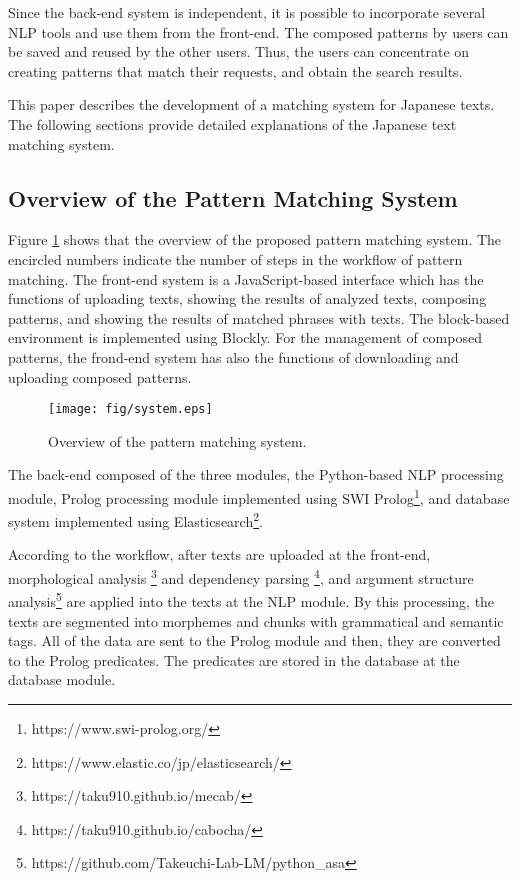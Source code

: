 \documentclass[conference]{IEEEtran}
\begin{document}
Since the back-end system is independent, it is possible to incorporate several NLP tools
and use them from the front-end. The composed patterns by users can be saved and reused by
the other users. Thus, the users can concentrate on creating patterns that match their requests,
and obtain the search results.


This paper describes the development of a matching system for Japanese texts.
The following sections provide detailed explanations of the Japanese text matching system.



\subsection{Overview of the Pattern Matching System} %
Figure \ref{fig:sys} shows that the overview of the proposed pattern matching system.
The encircled numbers indicate the number of steps in the workflow of pattern matching.
The front-end system is a JavaScript-based interface which has the functions of
uploading texts, showing the results of analyzed texts, composing patterns, and showing the results of
matched phrases with texts. The block-based environment is implemented using Blockly.
For the management of composed patterns, the frond-end system has also
the functions of downloading and uploading composed patterns.

\begin{figure}[htbp]
  \centerline{\texttt{[image: fig/system.eps]}}
  \caption{Overview of the pattern matching system.}
  \label{fig:sys}
\end{figure}

The back-end composed of the three modules, the Python-based NLP processing module,
Prolog processing module implemented using SWI Prolog\footnote{https://www.swi-prolog.org/},
and database system implemented using Elasticsearch\footnote{https://www.elastic.co/jp/elasticsearch/}.

According to the workflow, after texts are uploaded at the front-end,
morphological analysis \footnote{https://taku910.github.io/mecab/} and
dependency parsing \footnote{https://taku910.github.io/cabocha/}, and
argument structure analysis\footnote{https://github.com/Takeuchi-Lab-LM/python\_asa}
\cite{take2011f} are applied into the texts at the NLP module.
By this processing, the texts are segmented into morphemes and
chunks with grammatical and semantic tags.
All of the data are sent to the Prolog module and then, they are converted
to the Prolog predicates. The predicates are stored in the database at the database module.
\end{document}
